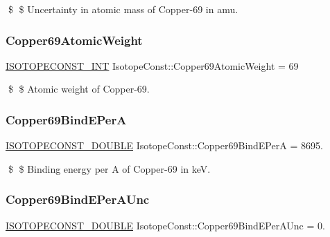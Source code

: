 \$ \$ Uncertainty in atomic mass of Copper-\/69 in amu. \mbox{\label{group___isotope_const-_copper-_cu69_ga78f45a4e2893783a1d7aca895dbabcf1}} 
\subsubsection{\texorpdfstring{Copper69\+Atomic\+Weight}{Copper69AtomicWeight}}
{\footnotesize\ttfamily \mbox{\hyperlink{group___isotope_const-_macros_ga5f18360b3e99483a35c32d789e62621c}{I\+S\+O\+T\+O\+P\+E\+C\+O\+N\+S\+T\+\_\+\+I\+NT}} Isotope\+Const\+::\+Copper69\+Atomic\+Weight = 69}

\$ \$ Atomic weight of Copper-\/69. \mbox{\label{group___isotope_const-_copper-_cu69_ga3d3ed74f4f41d27be1c3f114859e2f6e}} 
\subsubsection{\texorpdfstring{Copper69\+Bind\+E\+PerA}{Copper69BindEPerA}}
{\footnotesize\ttfamily \mbox{\hyperlink{group___isotope_const-_macros_ga8f45a7272ce02c0b4c65c44636ed719a}{I\+S\+O\+T\+O\+P\+E\+C\+O\+N\+S\+T\+\_\+\+D\+O\+U\+B\+LE}} Isotope\+Const\+::\+Copper69\+Bind\+E\+PerA = 8695.}

\$ \$ Binding energy per A of Copper-\/69 in keV. \mbox{\label{group___isotope_const-_copper-_cu69_ga08ab9d1fbda3dc87b3add7142fe70269}} 
\subsubsection{\texorpdfstring{Copper69\+Bind\+E\+Per\+A\+Unc}{Copper69BindEPerAUnc}}
{\footnotesize\ttfamily \mbox{\hyperlink{group___isotope_const-_macros_ga8f45a7272ce02c0b4c65c44636ed719a}{I\+S\+O\+T\+O\+P\+E\+C\+O\+N\+S\+T\+\_\+\+D\+O\+U\+B\+LE}} Isotope\+Const\+::\+Copper69\+Bind\+E\+Per\+A\+Unc = 0.}

